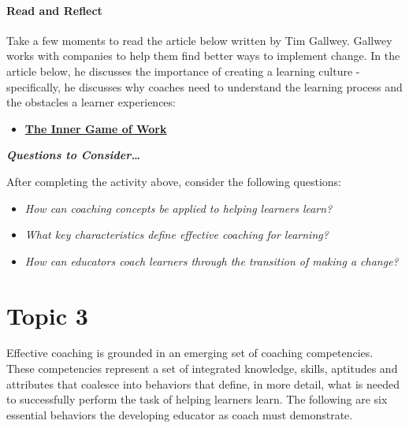\documentclass[
]{book}
\providecommand{\tightlist}{%
  \setlength{\itemsep}{0pt}\setlength{\parskip}{0pt}}
\begin{document}
\begin{reflect}
\hypertarget{read-and-reflect}{%
\paragraph{Read and Reflect}\label{read-and-reflect}}

Take a few moments to read the article below written by Tim Gallwey.
Gallwey works with companies to help them find better ways to implement
change. In the article below, he discusses the importance of creating a
learning culture - specifically, he discusses why coaches need to
understand the learning process and the obstacles a learner experiences:

\begin{itemize}
\tightlist
\item
  \href{https://thesystemsthinker.com/the-inner-game-of-work-building-capability-in-the-workplace/}{\textbf{The
  Inner Game of Work}}
\end{itemize}

\textbf{\emph{Questions to Consider\ldots{}}}

After completing the activity above, consider the following questions:

\begin{itemize}
\tightlist
\item
  \emph{How can coaching concepts be applied to helping learners learn?}
\item
  \emph{What key characteristics define effective coaching for
  learning?}
\item
  \emph{How can educators coach learners through the transition of
  making a change?}
\end{itemize}
\end{reflect}

\hypertarget{topic-3-1}{%
\section*{Topic 3}\label{topic-3-1}}

Effective coaching is grounded in an emerging set of coaching competencies. These competencies represent a set of integrated knowledge, skills, aptitudes and attributes that coalesce into behaviors that define, in more detail, what is needed to successfully perform the task of helping learners learn. The following are six essential behaviors the developing educator as coach must demonstrate.
\end{document}
